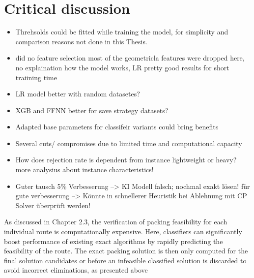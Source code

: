 \chapter{Critical discussion}
\label{chap:critical_discussion}
\begin{itemize}
    \item Threhsolds could be fitted while training the model, for simplicity and comparison reasons not done in this Thesis.
    \item \cite{zhang_learning-based_2022} did no feature selection most of the geometricla features were dropped here, no
          explaination how the model works, \gls{LR} pretty good results for short traiining time
    \item LR model better with random datasetes?
    \item XGB and FFNN better for save strategy datasets?
    \item Adapted base parameters for classifeir variants could bring benefits
    \item Several cuts/ compromises due to limited time and computational capacity
    \item How does rejection rate is dependent from instance lightweight or heavy? more analysius about instance characteristics!
    \item Guter tausch 5\% Verbesserung --> KI Modell falsch; nochmal exakt lösen! für gute verbesserung --> Könnte in schnellerer Heuristik bei Ablehnung mit CP Solver überprüft werden!
\end{itemize}

As discussed in Chapter 2.3, the verification of packing feasibility for each individual
route is computationally expensive. Here, classifiers can significantly boost performance
of existing exact algorithms by rapidly predicting the feasibility of the route. The exact
packing solution is then only computed for the final solution candidates or before an
infeasible classified solution is discarded to avoid incorrect eliminations, as presented
above

\clearpage
